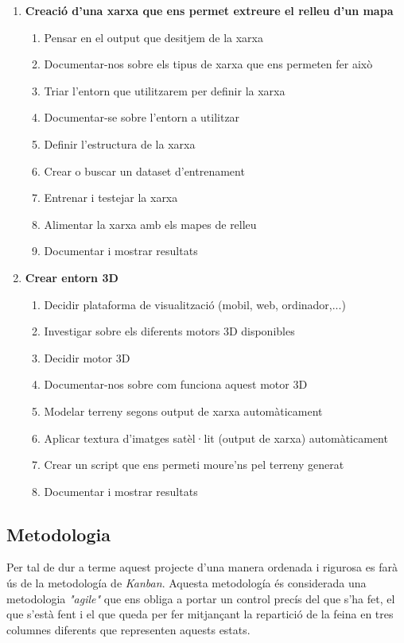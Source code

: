﻿\documentclass[10pt,a4paper,twocolumn,twoside]{article}
\begin{document}
\begin{enumerate}
\item \textbf{Creació d'una xarxa que ens permet extreure el relleu d'un mapa}
\begin{enumerate}
\item Pensar en el output que desitjem de la xarxa
\item Documentar-nos sobre els tipus de xarxa que ens permeten fer això
\item Triar l'entorn que utilitzarem per definir la xarxa
\item Documentar-se sobre l'entorn a utilitzar
\item Definir l'estructura de la xarxa
\item Crear o buscar un dataset d'entrenament
\item Entrenar i testejar la xarxa
\item Alimentar la xarxa amb els mapes de relleu
\item Documentar i mostrar resultats
\end{enumerate}

\item \textbf{Crear entorn 3D}
\begin{enumerate}
\item Decidir plataforma de visualització (mobil, web, ordinador,...)
\item Investigar sobre els diferents motors 3D disponibles
\item Decidir motor 3D
\item Documentar-nos sobre com funciona aquest motor 3D
\item Modelar terreny segons output de xarxa automàticament
\item Aplicar textura d'imatges satèl·lit (output de xarxa) automàticament
\item Crear un script que ens permeti moure'ns pel terreny generat
\item Documentar i mostrar resultats
\end{enumerate}


\end{enumerate}


\subsection{Metodologia}
Per tal de dur a terme aquest projecte d'una manera ordenada i rigurosa es farà ús de la metodología de \textit{Kanban}\cite{kanban}.
Aquesta metodología és considerada una metodologia \textit{"agile"} que ens obliga a portar un control precís del que s'ha fet, el que s'està fent i el que queda per fer mitjançant la repartició de la feina en tres columnes diferents que representen aquests estats.\\
\end{document}
